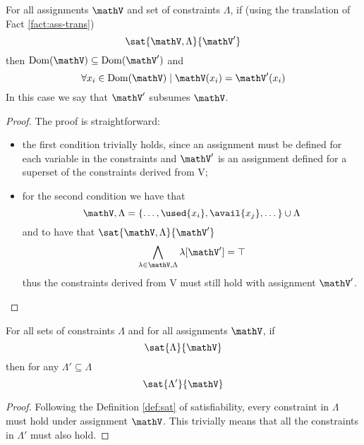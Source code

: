 \begin{lemma}
	\label{lemma:constr}
	For all assignments $\mathV$ and set of constraints $\Lambda$, if (using the translation of Fact \ref{fact:ass-trans})
	$$ \sat{\mathV, \Lambda}{\mathV'} $$
	then $\mathrm{Dom}(\mathV) \subseteq \mathrm{Dom}(\mathV')$ and
	$$ \forall x_i \in \mathrm{Dom}(\mathV) \mid \mathV(x_i) = \mathV'(x_i) $$
	In this case we say that $\mathV'$ subsumes $\mathV$.
\end{lemma}
\begin{proof}
	The proof is straightforward: 
	\begin{itemize}
		\item the first condition trivially holds, since an assignment must be defined for each variable in the constraints and $\mathV'$ is an assignment defined for a superset of the constraints derived from V;
		\item for the second condition we have that
			$$ \mathV, \Lambda = \{ \dots, \used{x_i}, \avail{x_j}, \dots \} \cup \Lambda $$
		and to have that $ \sat{\mathV, \Lambda}{\mathV'} $
			$$ \bigwedge_{\lambda \in \mathV, \Lambda} \lambda[\mathV'] = \top $$
		thus the constraints derived from V must still hold with assignment $\mathV'$.
	\end{itemize}
\end{proof}
\begin{lemma}
	\label{lemma:subsume}
	For all sets of constraints $\Lambda$ and for all assignments $\mathV$, if
	$$ \sat{\Lambda}{\mathV} $$
	then for any $\Lambda' \subseteq \Lambda$
	$$ \sat{\Lambda'}{\mathV} $$
\end{lemma}
\begin{proof}
	Following the Definition \ref{def:sat} of satisfiability, every constraint in $\Lambda$ must hold under assignment $\mathV$.
	This trivially means that all the constraints in $\Lambda'$ must also hold.
\end{proof}

